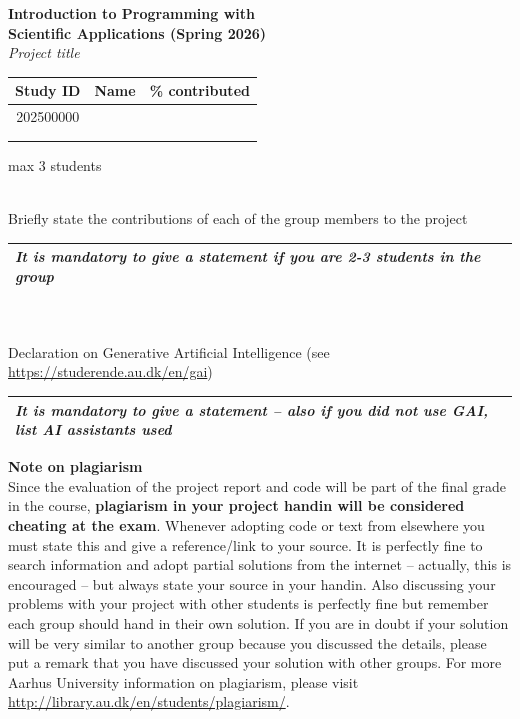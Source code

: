 \documentclass[a4paper, 11pt]{report}
\begin{document}

\thispagestyle{empty}
\setcounter{page}{0}

\begin{center}
  \huge
  \textbf{Introduction to Programming with \\
  Scientific Applications (Spring 2026)} \\[2ex]
  \textit{\color{red}Project title} \\[3ex]
\end{center}
\noindent
\begin{tabularx}{\textwidth}{|c|X|c|}
\multicolumn{1}{c}{Study ID} & 
\multicolumn{1}{l}{Name} & 
\multicolumn{1}{l}{\% contributed} \\
\hline
202500000 & & \\ %
\hline
& & \\ %
\hline
& & \\ %
\hline
\end{tabularx}
\centerline{max 3 students}
\\[2ex]
\noindent
Briefly state the contributions of each of the group members to the project
\\
\begin{tabularx}{\textwidth}{|X|}
\hline
\textit{\color{red}It is mandatory to give a statement if you are 2-3 students in the group}
\\[3cm]
\hline 
\end{tabularx}
\\[2ex]
\noindent
\\
Declaration on Generative Artificial Intelligence (see \url{https://studerende.au.dk/en/gai})
\begin{tabularx}{\textwidth}{|X|}
\hline
\textit{\color{red}It is mandatory to give a statement -- also if you did not use GAI, 
list AI assistants used}
\\[3cm]
\hline 
\end{tabularx}


\vfill
\noindent
\textbf{Note on plagiarism} 
\\[2ex]
Since the evaluation of the project report and code will be part of the final grade in the course, \textbf{plagiarism in your project handin will be considered cheating at the exam}. Whenever adopting code or text from elsewhere you must state this and give a reference/link to your source. It is perfectly fine to search information and adopt partial solutions from the internet -- actually, this is encouraged -- but always state your source in your handin. Also discussing your problems with your project with other students is perfectly fine but remember each group should hand in their own solution. If you are in doubt if your solution will be very similar to another group because you discussed the details, please put a remark that you have discussed your solution with other groups. For more Aarhus University information on plagiarism, please visit \url{http://library.au.dk/en/students/plagiarism/}.

\newpage


\end{document}
